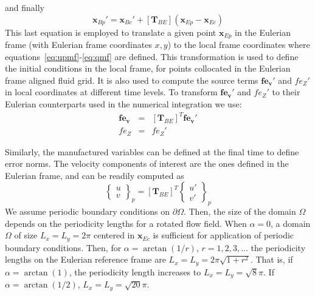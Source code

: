 \documentclass[11pt]{book}
\begin{document}
%
and finally
%
\begin{equation}
    \mathbf{x}_{Bp}'= \mathbf{x}_{Bc}' +[\mathbf{T}_{BE}] \left( \mathbf{x}_{Ep} - \mathbf{x}_{Ec} \right)
\end{equation}
%
This last equation is employed to translate a given point $\mathbf{x}_{Ep}$ in the Eulerian frame (with Eulerian frame coordinates $x,y$) to the local frame coordinates where equations~\eqref{eq:upmf}-\eqref{eq:qmf} are defined. This transformation is used to define the initial conditions in the local frame, for points collocated in the Eulerian frame aligned fluid grid. It is also used to compute the source terms $\mathbf{fe_v'}$ and $fe_Z'$ in local coordinates at different time levels.
To transform  $\mathbf{fe_v'}$ and $fe_Z'$ to their Eulerian counterparts used in the numerical integration we use:
%
\begin{eqnarray}
  \mathbf{fe_v} &=& [\mathbf{T}_{BE}]^T \mathbf{fe_v'} \\
  fe_Z &=& fe_Z'
\end{eqnarray}
%

Similarly, the manufactured variables can be defined at the final time to define error norms. The velocity components of interest are the ones defined in the Eulerian frame, and can be readily computed as
%
\begin{equation}
  \left\{ \begin{array}{c}  u \\ v \end{array} \right\}_p = [\mathbf{T}_{BE}]^T \left\{ \begin{array}{c}  u' \\ v' \end{array} \right\}_p
\end{equation}
%
We assume periodic boundary conditions on $\partial \Omega$. Then, the size of the domain $\Omega$ depends on the periodicity lengths for a rotated flow field.
When $\alpha=0$, a domain $\Omega$ of size $L_x=L_y=2\pi$ centered in $\mathbf{x}_{Ec}$ is sufficient for application of periodic boundary conditions. Then, for $\alpha=\arctan(1/r)$, $r=1,2,3,...$ the periodicity lengths on the Eulerian reference frame are $L_x=L_y=2\pi \sqrt{1+r^2}$.
That is, if $\alpha=\arctan(1)$,  the periodicity length increases to $L_x=L_y=\sqrt{8} \pi$. If $\alpha=\arctan(1/2)$, $L_x=L_y=\sqrt{20} \pi$.

\end{document}
